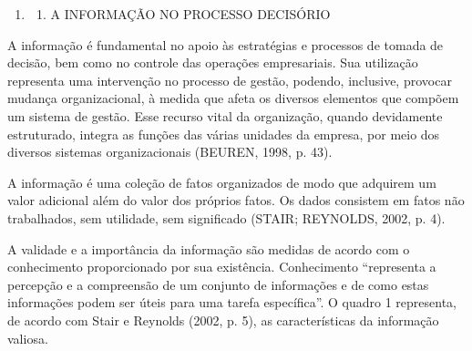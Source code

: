 \documentclass[a4paper]{article}
\newcounter{saveenum}
\newcommand\liststyleWWviiiNumi{%
\renewcommand\theenumi{\arabic{enumi}}
\renewcommand\theenumii{\arabic{enumi}.\arabic{enumii}}
\renewcommand\theenumiii{\arabic{enumi}.\arabic{enumii}.\arabic{enumiii}}
\renewcommand\theenumiv{\arabic{enumi}.\arabic{enumii}.\arabic{enumiii}.\arabic{enumiv}}
\renewcommand\labelenumi{\theenumi}
\renewcommand\labelenumii{\theenumii}
\renewcommand\labelenumiii{\theenumiii}
\renewcommand\labelenumiv{\theenumiv.}
}
\begin{document}
\liststyleWWviiiNumi
\setcounter{saveenum}{\value{enumi}}
\begin{enumerate}
\setcounter{enumi}{\value{saveenum}}
\item \setcounter{saveenum}{\value{enumii}}
\begin{enumerate}
\setcounter{enumii}{\value{saveenum}}
\item {\sffamily
A INFORMA\c{C}\~AO NO PROCESSO DECIS\'ORIO}
\end{enumerate}
\end{enumerate}
{\sffamily
A informa\c{c}\~ao \'e fundamental no apoio \`as estrat\'egias e processos de tomada de decis\~ao, bem como no controle
das opera\c{c}\~oes empresariais. Sua utiliza\c{c}\~ao representa uma interven\c{c}\~ao no processo de gest\~ao,
podendo, inclusive, provocar mudan\c{c}a organizacional, \`a medida que afeta os diversos elementos que comp\~oem um
sistema de gest\~ao. Esse recurso vital da organiza\c{c}\~ao, quando devidamente estruturado, integra as fun\c{c}\~oes
das v\'arias unidades da empresa, por meio dos diversos sistemas organizacionais (BEUREN, 1998, p. 43). }

{
\textsf{A informa\c{c}\~ao \'e uma cole\c{c}\~ao de fatos organizados de modo que adquirem um valor adicional al\'em do
valor dos pr\'oprios fatos. Os dados consistem em fatos n\~ao trabalhados, sem utilidade, sem significado (STAIR;
REYNOLDS, 2002, p. 4).}}

{
\textsf{A validade e a import\^ancia da informa\c{c}\~ao s\~ao medidas de acordo com o conhecimento proporcionado por
sua exist\^encia. Conhecimento ``representa a percep\c{c}\~ao e a compreens\~ao de um conjunto de informa\c{c}\~oes e
de como estas informa\c{c}\~oes podem ser \'uteis para uma tarefa espec\'ifica''. O quadro 1 representa, de acordo com
Stair e Reynolds (2002, p. 5), as caracter\'isticas da informa\c{c}\~ao valiosa.}}


\bigskip


\bigskip


\bigskip
\end{document}

